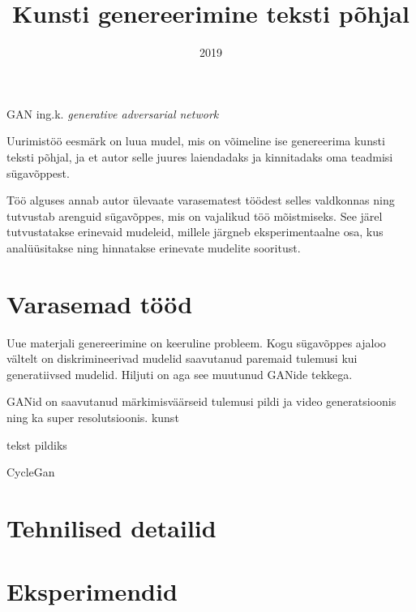 \documentclass{vilgym}
\title{Kunsti genereerimine teksti põhjal}
\date{2019}
\begin{document}
    \maketitle
    \tableofcontents

    \begin{description}
		\let\originalitem\item
		\renewcommand*{\item}[1][]{\originalitem[#1]\label{def:#1}}

        \item{GAN} ing.k. \textit{generative adversarial network}
    \end{description}

	\newcommand*{\seedefinition}[1]{(\hyperref[def:#1]{vt~definitsiooni})}

    

    Uurimistöö eesmärk on luua mudel, mis on võimeline ise genereerima kunsti teksti põhjal, ja et autor selle juures laiendadaks ja kinnitadaks oma teadmisi sügavõppest.

    Töö alguses annab autor ülevaate varasematest töödest selles valdkonnas ning tutvustab arenguid sügavõppes, mis on vajalikud töö mõistmiseks. See järel tutvustatakse erinevaid mudeleid, millele järgneb eksperimentaalne osa, kus analüüsitakse ning hinnatakse erinevate mudelite sooritust. 
    
    \section{Varasemad tööd}
    Uue materjali genereerimine on keeruline probleem. Kogu sügavõppes ajaloo vältelt on diskrimineerivad mudelid saavutanud paremaid tulemusi kui generatiivsed mudelid. Hiljuti on aga see muutunud GANide tekkega.

    GANid on saavutanud märkimisväärseid tulemusi pildi ja video generatsioonis ning ka super resolutsioonis. kunst

    tekst pildiks

    CycleGan 

    \section{Tehnilised detailid}

    \section{Eksperimendid}



    

\end{document}
